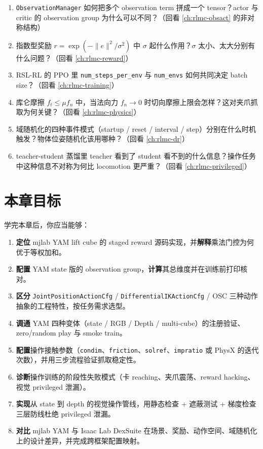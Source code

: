 \begin{practice}
\begin{enumerate}
  \item \verb|ObservationManager| 如何把多个 observation term 拼成一个 tensor？actor 与 critic 的 observation group 为什么可以不同？（回看 \cref{ch:rlmc-obsact} 的非对称结构）
  \item 指数型奖励 $r=\exp(-\|e\|^2/\sigma^2)$ 中 $\sigma$ 起什么作用？$\sigma$ 太小、太大分别有什么问题？（回看 \cref{ch:rlmc-reward}）
  \item RSL-RL 的 PPO 里 \verb|num_steps_per_env| 与 \verb|num_envs| 如何共同决定 batch size？（回看 \cref{ch:rlmc-training}）
  \item 库仑摩擦 $f_t \le \mu f_n$ 中，当法向力 $f_n \to 0$ 时切向摩擦上限会怎样？这对夹爪抓取为何关键？（回看 \cref{ch:rlmc-physics}）
  \item 域随机化的四种事件模式（startup / reset / interval / step）分别在什么时机触发？物体位姿随机化该用哪种？（回看 \cref{ch:rlmc-dr}）
  \item teacher-student 蒸馏里 teacher 看到了 student 看不到的什么信息？操作任务中这种信息不对称为何比 locomotion 更严重？（回看 \cref{ch:rlmc-privileged}）
\end{enumerate}
\end{practice}

\section*{本章目标}
\label{sec:rlmc-manip-goals}

学完本章后，你应当能够：

\begin{enumerate}
  \item \textbf{定位} mjlab YAM lift cube 的 staged reward 源码实现，并\textbf{解释}乘法门控为何优于等权加和。
  \item \textbf{配置} YAM state 版的 observation group，\textbf{计算}其总维度并在训练前打印核对。
  \item \textbf{区分} \verb|JointPositionActionCfg| / \verb|DifferentialIKActionCfg| / OSC 三种动作抽象的工程特性，按任务需求选型。
  \item \textbf{调通} YAM 四种变体（state / RGB / Depth / multi-cube）的注册验证、zero/random play 与 smoke train。
  \item \textbf{配置}操作接触参数（\verb|condim|、\verb|friction|、\verb|solref|、\verb|impratio| 或 PhysX 的迭代次数），并用三步流程验证抓取稳定性。
  \item \textbf{诊断}操作训练的阶段性失败模式（卡 reaching、夹爪震荡、reward hacking、视觉 privileged 泄漏）。
  \item \textbf{实现}从 state 到 depth 的视觉操作管线，用静态检查 + 遮蔽测试 + 梯度检查三层防线杜绝 privileged 泄漏。
  \item \textbf{对比} mjlab YAM 与 Isaac Lab DexSuite 在场景、奖励、动作空间、域随机化上的设计差异，并完成跨框架配置映射。
\end{enumerate}

